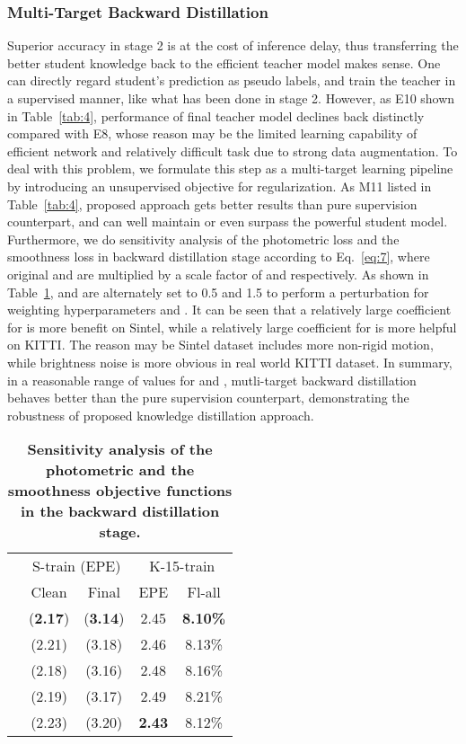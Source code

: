 \documentclass[lettersize,journal]{IEEEtran}
\begin{document}
\subsubsection{Multi-Target Backward Distillation}
Superior accuracy in stage 2 is at the cost of inference delay, thus transferring the better student knowledge back to the efficient teacher model makes sense. One can directly regard student's prediction as pseudo labels, and train the teacher in a supervised manner, like what has been done in stage 2. However, as E10 shown in Table~\ref{tab:4}, performance of final teacher model declines back distinctly compared with E8, whose reason may be the limited learning capability of efficient network and relatively difficult task due to strong data augmentation. To deal with this problem, we formulate this step as a multi-target learning pipeline by introducing an unsupervised objective for regularization. As M11 listed in Table~\ref{tab:4}, proposed approach gets better results than pure supervision counterpart, and can well maintain or even surpass the powerful student model. Furthermore, we do sensitivity analysis of the photometric loss  and the smoothness loss  in backward distillation stage according to Eq.~\ref{eq:7}, where original  and  are multiplied by a scale factor of  and  respectively. As shown in Table~\ref{tab:6},  and  are alternately set to 0.5 and 1.5 to perform a perturbation for weighting hyperparameters  and . It can be seen that a relatively large coefficient for  is more benefit on Sintel, while a relatively large coefficient for  is more helpful on KITTI. The reason may be Sintel dataset includes more non-rigid motion, while brightness noise is more obvious in real world KITTI dataset. In summary, in a reasonable range of values for  and , mutli-target backward distillation behaves better than the pure supervision counterpart, demonstrating the robustness of proposed knowledge distillation approach.

\begin{table}[t]
	\caption{\textbf{Sensitivity analysis of the photometric and the smoothness objective functions in the backward distillation stage.}}
	\label{tab:6}
	\centering
	\renewcommand{\arraystretch}{1.1}
	\tabcolsep=4.0mm
	\begin{tabular}{ccccc}
		\toprule
		 & \multicolumn{2}{c}{S-train (EPE)} & \multicolumn{2}{c}{K-15-train} \\
		\cmidrule(lr){2-3}
		\cmidrule(lr){4-5}
		 & Clean & Final & EPE & Fl-all \\
		\midrule
		 & (\textbf{2.17}) & (\textbf{3.14}) & 2.45 & \textbf{8.10\%} \\
		 & (2.21) & (3.18) & 2.46 & 8.13\% \\
		 & (2.18) & (3.16) & 2.48 & 8.16\% \\
		 & (2.19) & (3.17) & 2.49 & 8.21\% \\
		 & (2.23) & (3.20) & \textbf{2.43} & 8.12\% \\
		\bottomrule
	\end{tabular}
\end{table}
\end{document}
